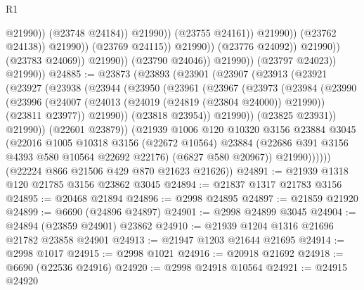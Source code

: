 \begin{lexlean}{R1}
\begin{coremodule}
                                                        @21990))
                                                    (@23748 @24184))
                                                  @21990))
                                              (@23755 @24161))
                                            @21990))
                                        (@23762 @24138))
                                      @21990))
                                  (@23769 @24115))
                                @21990))
                            (@23776 @24092))
                          @21990))
                      (@23783 @24069))
                    @21990))
                (@23790 @24046))
              @21990))
          (@23797 @24023))
        @21990))
@24885 := @23873
    (@23893
      (@23901
        (@23907
          (@23913
            (@23921
              (@23927
                (@23938
                  (@23944
                    (@23950
                      (@23961
                        (@23967
                          (@23973
                            (@23984
                              (@23990
                                (@23996
                                  (@24007
                                    (@24013 (@24019 (@24819 (@23804 @24000)) @21990))
                                    (@23811 @23977))
                                  @21990))
                              (@23818 @23954))
                            @21990))
                        (@23825 @23931))
                      @21990))
                  (@22601 @23879))
                (@21939
                  @1006
                  @120
                  @10320
                  @3156
                  @23884
                  @3045
                  (@22016
                    @1005
                    @10318
                    @3156
                    (@22672 @10564)
                    @23884
                    (@22686 @391 @3156 @4393 @580 @10564 @22692 @22176)
                    (@6827 @580 @20967))
                  @21990))))))
      (@22224 @866 @21506 @429 @870 @21623 @21626))
@24891 := @21939 @1318 @120 @21785 @3156 @23862 @3045
@24894 := @21837 @1317 @21783 @3156
@24895 := @20468 @21894
@24896 := @2998 @24895
@24897 := @21859 @21920
@24899 := @6690 (@24896 @24897)
@24901 := @2998 @24899 @3045
@24904 := @24894 (@23859 @24901) @23862
@24910 := @21939 @1204 @1316 @21696 @21782 @23858 @24901
@24913 := @21947 @1203 @21644 @21695
@24914 := @2998 @1017
@24915 := @2998 @1021
@24916 := @20918 @21692
@24918 := @6690 (@22536 @24916)
@24920 := @2998 @24918 @10564
@24921 := @24915 @24920

\end{coremodule}
\end{lexlean}
